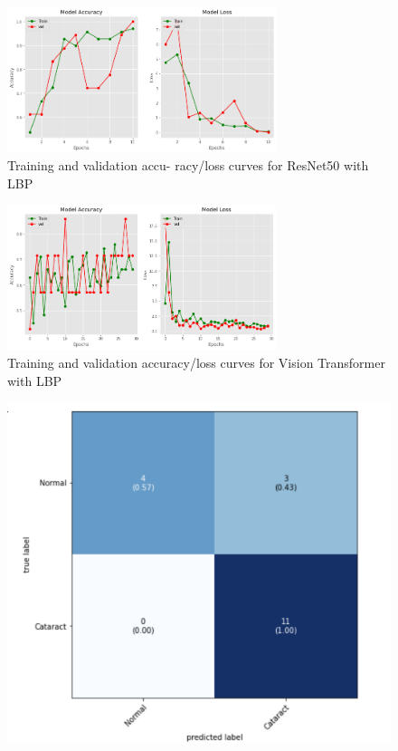 \documentclass{ijclclp}
\begin{document}
\begin{flushleft}
\begin{figure}[htbp]
    \centering
    \includegraphics[width=0.7\textwidth]{image15.png}
    \caption{Training and validation accu-
racy/loss curves for ResNet50 with LBP}
    \label{fig:resnet50_lbp}
\end{figure}
\begin{figure}[htbp]
    \centering
    \includegraphics[width=0.7\textwidth]{image16.png}
    \caption{Training and validation accuracy/loss curves for Vision Transformer with LBP}
    \label{fig:vit_with_lbp}
\end{figure}
\noindent
\begin{figure}[htbp]
    \centering
    \begin{minipage}[b]{0.48\textwidth}
    \includegraphics[width=\textwidth]{vgg19_confusion.png}

\end{minipage}
\end{figure}
\end{flushleft}
\end{document}
